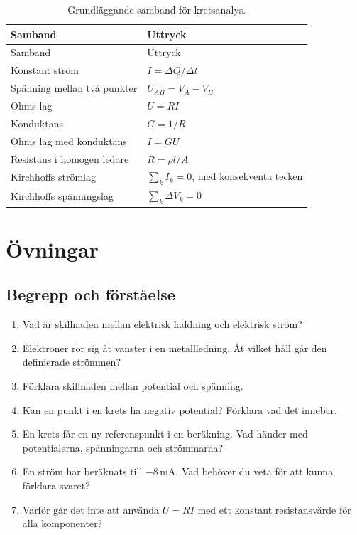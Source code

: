 \documentclass[
  swedish,
  11pt,
  a4paper,
  DIV=11,
  numbers=noendperiod,
  twoside,
  open=any]{scrreprt}
\begin{document}
\begin{longtable}[]{@{}ll@{}}
\caption{Grundläggande samband för
kretsanalys.}\label{tbl-grundlaggande-samband}\tabularnewline
\toprule\noalign{}
Samband & Uttryck \\
\midrule\noalign{}
\endfirsthead
\toprule\noalign{}
Samband & Uttryck \\
\midrule\noalign{}
\endhead
\bottomrule\noalign{}
\endlastfoot
Konstant ström & \(I = \Delta Q/\Delta t\) \\
Spänning mellan två punkter & \(U_{AB} = V_A - V_B\) \\
Ohms lag & \(U = RI\) \\
Konduktans & \(G = 1/R\) \\
Ohms lag med konduktans & \(I = GU\) \\
Resistans i homogen ledare & \(R = \rho l/A\) \\
Kirchhoffs strömlag & \(\sum_k I_k = 0\), med konsekventa tecken \\
Kirchhoffs spänningslag & \(\sum_k \Delta V_k = 0\) \\
\end{longtable}

\section{Övningar}\label{sec-grunder-ovningar}

\subsection{Begrepp och
förståelse}\label{sec-grunder-begrepp-och-forstaelse}

\begin{enumerate}
\def\labelenumi{\arabic{enumi}.}
\item
  Vad är skillnaden mellan elektrisk laddning och elektrisk ström?
\item
  Elektroner rör sig åt vänster i en metallledning. Åt vilket håll går
  den definierade strömmen?
\item
  Förklara skillnaden mellan potential och spänning.
\item
  Kan en punkt i en krets ha negativ potential? Förklara vad det
  innebär.
\item
  En krets får en ny referenspunkt i en beräkning. Vad händer med
  potentialerna, spänningarna och strömmarna?
\item
  En ström har beräknats till \(-8\,\mathrm{mA}\). Vad behöver du veta
  för att kunna förklara svaret?
\item
  Varför går det inte att använda \(U = RI\) med ett konstant
  resistansvärde för alla komponenter?
\end{enumerate}
\end{document}
